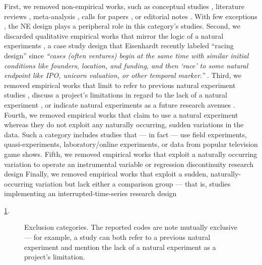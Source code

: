 First, we removed non-empirical works, such as conceptual studies 
\parencite[e.g.,][]{eden2021}, literature reviews
\parencite[e.g.,][]{shaver2020}, meta-analysis
\parencite[e.g.,][]{geyskens2006}, calls for papers
\parencite[e.g.,][]{jacquart2020}, or editorial notes
\parencite[e.g.,][]{breschi2020}. With few exceptions
\parencite[e.g.,][]{sieweke2020}, the NE design plays a peripheral role in this
category's studies. Second, we discarded qualitative empirical works that mirror
the logic of a natural experiments \parencite[e.g.,][]{powell2017}, a case study
design that Eisenhardt recently labeled ``racing design'' since \textit{``cases
(often ventures) begin at the same time with similar initial conditions like
founders, location, and funding, and then `race' to some natural endpoint like
IPO, unicorn valuation, or other temporal marker.''} \parencite[page
150,][]{eisenhardt2021}.  Third, we removed empirical works that limit to refer
to previous natural experiment studies \parencite[e.g.,][]{stevens2021}, discuss
a project's limitations in regard to the lack of a natural experiment
\parencite[e.g.,][]{chen2020}, or indicate natural experiments as a future
research avenues \parencite[e.g.,][]{xie0000}.  Fourth, we removed empirical
works that claim to use a natural experiment whereas they do not exploit any
naturally occurring, sudden variations in the data. Such a category includes
studies that --- in fact --- use field experiments, quasi-experiments,
laboratory/online experiments, or data from popular television game shows. Fifth, we removed
empirical works that exploit a naturally occurring variation to operate an
instrumental variable or regression discontinuity research design Finally, we
removed empirical works that exploit a sudden, naturally-occurring  variation
but lack either a comparison group --- that is, studies implementing an
interrupted-time-series research design \parencite[e.g.][]{corbo2016}

\ref{fig:exclusion_causes}. 

\begin{figure}
    \centering
    \sffamily
    \begin{small}
        \begin{center}
            
        \end{center}
        \caption{Exclusion categories. The reported codes are note mutually exclusive
        --- for example, a study can both refer to a previous natural experiment
        and mention the lack of a natural experiment as a project's limitation.}
        \label{fig:exclusion_causes}
    \end{small}
\end{figure}

